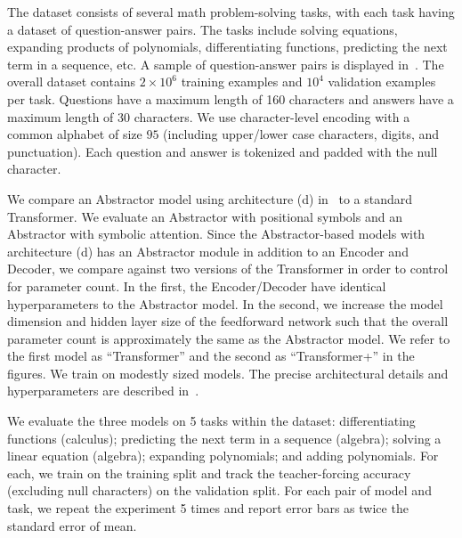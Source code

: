 The dataset consists of several math problem-solving tasks, with each task having a dataset of question-answer pairs. The tasks include solving equations, expanding products of polynomials, differentiating functions, predicting the next term in a sequence, etc. A sample of question-answer pairs is displayed in~. The overall dataset contains $2 \times 10^6$ training examples and $10^4$ validation examples per task. Questions have a maximum length of 160 characters and answers have a maximum length of 30 characters. We use character-level encoding with a common alphabet of size $95$ (including upper/lower case characters, digits, and punctuation). Each question and answer is tokenized and padded with the null character.

We compare an Abstractor model using architecture (d) in~ to a standard Transformer. We evaluate an Abstractor with positional symbols and an Abstractor with symbolic attention. Since the Abstractor-based models with architecture (d) has an Abstractor module in addition to an Encoder and Decoder, we compare against two versions of the Transformer in order to control for parameter count. In the first, the Encoder/Decoder have identical hyperparameters to the Abstractor model. In the second, we increase the model dimension and hidden layer size of the feedforward network such that the overall parameter count is approximately the same as the Abstractor model. We refer to the first model as ``Transformer'' and the second as ``Transformer+'' in the figures. We train on modestly sized models. The precise architectural details and hyperparameters are described in~.


We evaluate the three models on 5 tasks within the dataset: differentiating functions (calculus); predicting the next term in a sequence (algebra); solving a linear equation (algebra); expanding polynomials; and adding polynomials. For each, we train on the training split and track the teacher-forcing accuracy (excluding null characters) on the validation split. For each pair of model and task, we repeat the experiment 5 times and report error bars as twice the standard error of mean.

